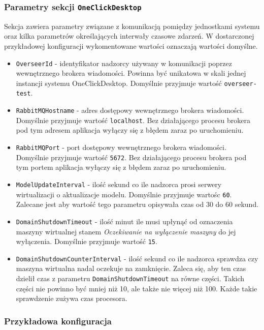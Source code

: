\documentclass[../opis-rozwiazania.tex]{subfiles}
\begin{document}
\subsubsection{Parametry sekcji \texttt{OneClickDesktop}}
Sekcja zawiera parametry związane z komunikacją pomiędzy jednostkami systemu oraz kilka parametrów określających interwały czasowe zdarzeń.
W dostarczonej przykładowej konfiguracji wykomentowane wartości oznaczają wartości domyślne.
\begin{itemize}
	\item \texttt{OverseerId} - identyfikator nadzorcy używany w komunikacji poprzez wewnętrznego brokera wiadomości. Powinna być unikatowa w skali jednej instancji systemu OneClickDesktop. Domyślnie przyjmuje wartość \texttt{overseer-test}.
	\item \texttt{RabbitMQHostname} - adres dostępowy wewnętrznego brokera wiadomości. Domyślnie przyjmuje wartość \texttt{localhost}. Bez działającego procesu brokera pod tym adresem aplikacja wyłączy się z błędem zaraz po uruchomieniu.
	\item \texttt{RabbitMQPort} - port dostępowy wewnętrznego brokera wiadomości. Domyślnie przyjmuje wartość \texttt{5672}. Bez działającego procesu brokera pod tym portem aplikacja wyłączy się z błędem zaraz po uruchomieniu.
	\item \texttt{ModelUpdateInterval} - ilość sekund co ile nadzorca prosi serwery wirtualizacji o aktualizacje modelu. Domyślnie przyjmuje wartośc \texttt{60}. Zalecane jest aby wartość tego parametru opisywała czas od 30 do 60 sekund.																												%
	\item \texttt{DomainShutdownTimeout} - ilość minut ile musi upłynąć od oznaczenia maszyny wirtualnej stanem \textit{Oczekiwanie na wyłączenie maszyny} do jej wyłączenia. Domyślnie przyjmuje wartość \texttt{15}.
	\item \texttt{DomainShutdownCounterInterval} - ilość sekund co ile nadzorca sprawdza czy maszyna wirtualna nadal oczekuje na zamknięcie. Zaleca się, aby ten czas dzielił czas z parametru \texttt{DomainShutdownTimeout} na równe części. Takich części nie powinno być mniej niż 10, ale także nie więcej niż 100. Każde takie sprawdzenie zużywa czas procesora.
\end{itemize}

\subsubsection{Przykładowa konfiguracja}
\end{document}
